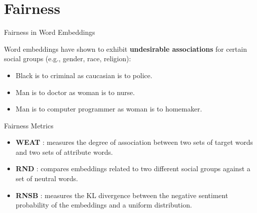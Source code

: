\documentclass[handout]{beamer}
\begin{document}
\section{Fairness}


\begin{frame}{Fairness in Word Embeddings}
\begin{scriptsize}
 Word embeddings have shown to exhibit \textbf{undesirable associations} for certain social groups (e.g., gender, race, religion):
\begin{itemize}
\item Black is to criminal as caucasian is to police.
\item Man is to doctor as woman is to nurse.
\item Man is to computer programmer as woman is to homemaker.
\end{itemize}


\end{scriptsize}
\end{frame}

\begin{frame}{Fairness Metrics}
\begin{scriptsize}

\begin{itemize}
 \item \textbf{WEAT} \cite{caliskan2017semantics}:  measures the degree of association between two sets of target words and two sets of attribute words.


\item \textbf{RND} \cite{garg2018word}: compares embeddings related to two different social groups against a set of neutral words.

\item \textbf{RNSB} \cite{sweeney2019transparent}:  measures the KL divergence between the negative sentiment probability of the embeddings and a uniform distribution.
\end{itemize}






\end{scriptsize}
\end{frame}
\end{document}
